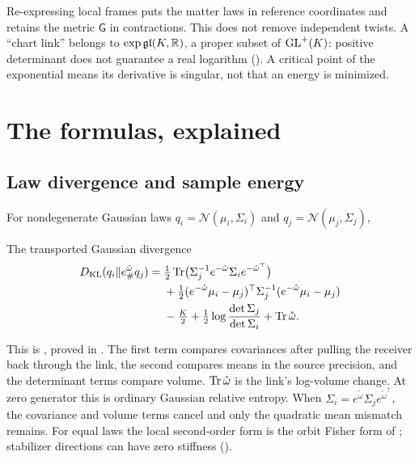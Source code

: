 Re-expressing local frames puts the matter laws in reference coordinates and retains the metric
\(\mathsf G\) in contractions. This does not remove independent twists. A ``chart link'' belongs
to \(\exp\mathfrak{gl}(K,\mathbb R)\), a proper subset of \(\mathrm{GL}^+(K)\): positive determinant does not
guarantee a real logarithm (). A critical point of the exponential
means its derivative is singular, not that an energy is minimized.

\clearpage
\section{The formulas, explained}

\subsection{Law divergence and sample energy}

For nondegenerate Gaussian laws \(q_i=\mathcal N(\mu_i,\Sigma_i)\) and
\(q_j=\mathcal N(\mu_j,\Sigma_j)\),
\begin{keyequation}{The transported Gaussian divergence}
\[
\begin{aligned}
D_{\mathrm{KL}}(q_i\Vert e^{\mathring\omega}_\#q_j)
={}&\tfrac12\operatorname{Tr}\bigl(\Sigma_j^{-1}e^{-\mathring\omega}\Sigma_i e^{-\mathring\omega^\top}\bigr)\\
&+\tfrac12(e^{-\mathring\omega}\mu_i-\mu_j)^\top\Sigma_j^{-1}(e^{-\mathring\omega}\mu_i-\mu_j)\\
&-\tfrac K2+\tfrac12\log\frac{\det\Sigma_j}{\det\Sigma_i}+\operatorname{Tr}\mathring\omega.
\end{aligned}
\]
\end{keyequation}
This is , proved in . The first
term compares covariances after pulling the receiver back through the link, the second compares
means in the source precision, and the determinant terms compare volume.
\(\operatorname{Tr}\mathring\omega\) is the link's log-volume change. At zero generator this is ordinary
Gaussian relative entropy. When
\(\Sigma_i=e^{\mathring\omega}\Sigma_j e^{\mathring\omega^\top}\), the covariance and volume terms
cancel and only the quadratic mean mismatch remains. For equal laws the local second-order form
is the orbit Fisher form of ; stabilizer directions can have zero
stiffness ().

